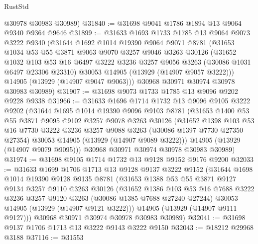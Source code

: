 \begin{lexlean}{RustStd}
\begin{coremodule}
      @30978
      @30983
      @30989)
@31840 := @31698 @9041 @1786 @1894 @13 @9064 @9340 @9364 @9646
@31899 := @31633
    @1693
    @1733
    @1785
    @13
    @9064
    @9073
    @3222
    @9340
    (@31644
      @1692
      @1014
      @19390
      @9064
      @9071
      @8781
      (@31653
        @1034
        @53
        @55
        @3871
        @9063
        @9070
        @3257
        @9046
        @3263
        @30126
        (@31652
          @1032
          @103
          @53
          @16
          @6497
          @3222
          @3236
          @3257
          @9056
          @3263
          (@30086 @1031 @6497 @23306 @23310)
          @30053
          @14905
          (@13929 (@14907 @9057 @3222)))
        @14905
        (@13929 (@14907 @9047 @9063)))
      @30968
      @30971
      @30974
      @30978
      @30983
      @30989)
@31907 := @31698 @9073 @1733 @1785 @13 @9096 @9202 @9228 @9338
@31966 := @31633
    @1696
    @1714
    @1732
    @13
    @9096
    @9105
    @3222
    @9202
    (@31644
      @1695
      @1014
      @19390
      @9096
      @9103
      @8781
      (@31653
        @1400
        @53
        @55
        @3871
        @9095
        @9102
        @3257
        @9078
        @3263
        @30126
        (@31652
          @1398
          @103
          @53
          @16
          @7730
          @3222
          @3236
          @3257
          @9088
          @3263
          (@30086 @1397 @7730 @27350 @27354)
          @30053
          @14905
          (@13929 (@14907 @9089 @3222)))
        @14905
        (@13929 (@14907 @9079 @9095)))
      @30968
      @30971
      @30974
      @30978
      @30983
      @30989)
@31974 := @31698 @9105 @1714 @1732 @13 @9128 @9152 @9176 @9200
@32033 := @31633
    @1699
    @1706
    @1713
    @13
    @9128
    @9137
    @3222
    @9152
    (@31644
      @1698
      @1014
      @19390
      @9128
      @9135
      @8781
      (@31653
        @1388
        @53
        @55
        @3871
        @9127
        @9134
        @3257
        @9110
        @3263
        @30126
        (@31652
          @1386
          @103
          @53
          @16
          @7688
          @3222
          @3236
          @3257
          @9120
          @3263
          (@30086 @1385 @7688 @27240 @27244)
          @30053
          @14905
          (@13929 (@14907 @9121 @3222)))
        @14905
        (@13929 (@14907 @9111 @9127)))
      @30968
      @30971
      @30974
      @30978
      @30983
      @30989)
@32041 := @31698 @9137 @1706 @1713 @13 @3222 @9143 @3222 @9150
@32043 := @18212 @29968 @3188
@37116 := @31553

\end{coremodule}
\end{lexlean}
